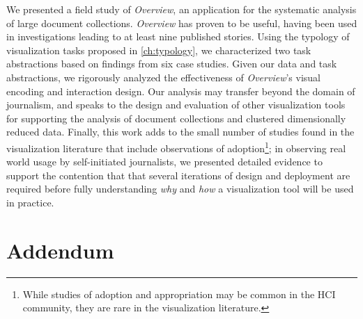 We presented a field study of {\it Overview}, an application for the systematic analysis of large document collections.
{\it Overview} has proven to be useful, having been used in investigations leading to at least nine published stories.
Using the typology of visualization tasks proposed in \autoref{ch:typology}, we characterized two task abstractions based on findings from six case studies.
Given our data and task abstractions, we rigorously analyzed the effectiveness of {\it Overview}'s visual encoding and interaction design.
Our analysis may transfer beyond the domain of journalism, and speaks to the design and evaluation of other visualization tools for supporting the analysis of document collections and clustered dimensionally reduced data.
Finally, this work adds to the small number of studies found in the visualization literature that include observations of adoption\footnote{While studies of adoption and appropriation may be common in the \ac{HCI} community, they are rare in the visualization literature.}; in observing real world usage by self-initiated journalists, we presented detailed evidence to support the contention that that several iterations of design and deployment are required before fully understanding {\it why} and {\it how} a visualization tool will be used in practice.


\section{Addendum}
\label{overview:addendum}

